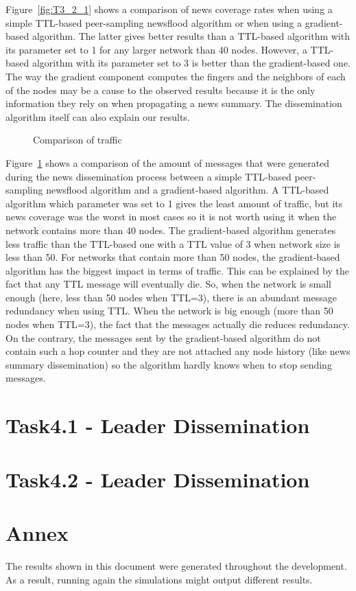 \documentclass[conference]{IEEEtran}
\begin{document}
Figure~\ref{fig:T3_2_1} shows a comparison of news coverage rates when using a simple TTL-based peer-sampling newsflood algorithm or when using a gradient-based algorithm.
The latter gives better results than a TTL-based algorithm with its parameter set to 1 for any larger network than 40 nodes.
However, a TTL-based algorithm with its parameter set to 3 is better than the gradient-based one.
The way the gradient component computes the fingers and the neighbors of each of the nodes may be a cause to the observed results because it is the only information they rely on when propagating a news summary.
The dissemination algorithm itself can also explain our results.

\begin{figure}
\caption{Comparison of traffic}
\label{fig:T3_2_2}
\end{figure}

Figure~\ref{fig:T3_2_2} shows a comparison of the amount of messages that were generated during the news dissemination process between a simple TTL-based peer-sampling newsflood algorithm and a gradient-based algorithm.
A TTL-based algorithm which parameter was set to 1 gives the least amount of traffic, but its news coverage was the worst in most cases so it is not worth using it when the network contains more than 40 nodes.
The gradient-based algorithm generates less traffic than the TTL-based one with a TTL value of 3 when network size is less than 50. For networks that contain more than 50 nodes, the gradient-based algorithm has the biggest impact in terms of traffic.
This can be explained by the fact that any TTL message will eventually die. So, when the network is small enough (here, less than 50 nodes when TTL=3), there is an abundant message redundancy when using TTL. When the network is big enough (more than 50 nodes when TTL=3), the fact that the messages actually die reduces redundancy.
On the contrary, the messages sent by the gradient-based algorithm do not contain such a hop counter and they are not attached any node history (like news summary dissemination) so the algorithm hardly knows when to stop sending messages.

\section{Task4.1 - Leader Dissemination}

\section{Task4.2 - Leader Dissemination}

\section{Annex}
The results shown in this document were generated throughout the development. As a result, running again the simulations might output different results.

\end{document}
